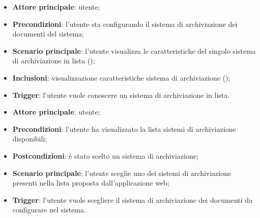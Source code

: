 \documentclass[10pt, a4paper]{article}
\begin{document}
    \begin{itemize}
        \item \textbf{Attore principale}: utente;
        \item \textbf{Precondizioni}: l’utente sta configurando il sistema di archiviazione dei documenti del sistema;
        \item \textbf{Scenario principale}: l'utente visualizza le caratteristiche del singolo sistema di archiviazione in lista ();
        \item \textbf{Inclusioni}: visualizzazione caratteristiche sistema di archiviazione ();
        \item \textbf{Trigger}: l’utente vuole conoscere un sistema di archiviazione in lista.
    \end{itemize}

    \begin{itemize}
        \item \textbf{Attore principale}: utente;
        \item \textbf{Precondizioni}: l’utente ha visualizzato la lista sistemi di archiviazione disponibili;
        \item \textbf{Postcondizioni}: è stato scelto un sistema di archiviazione;
        \item \textbf{Scenario principale}: l’utente sceglie uno dei sistemi di archiviazione presenti nella lista proposta dall’applicazione web;
        \item \textbf{Trigger}: l’utente vuole scegliere il sistema di archiviazione dei documenti da configurare nel sistema.
    \end{itemize}
\end{document}
